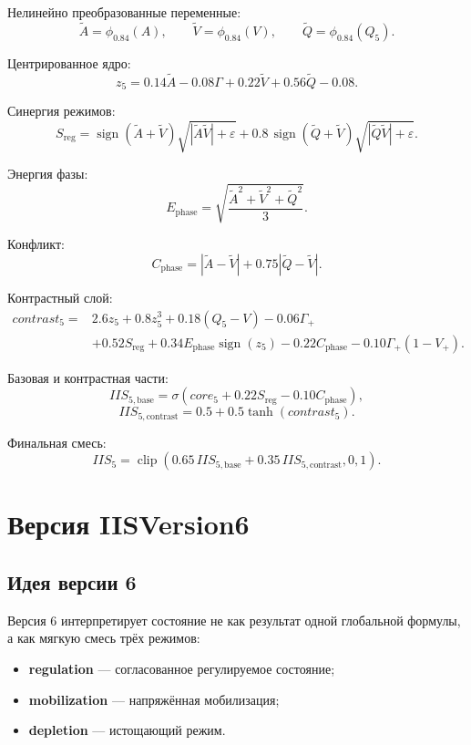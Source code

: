 \documentclass[12pt,a4paper]{article}
\begin{document}
Нелинейно преобразованные переменные:
\[
\widetilde{A}=\phi_{0.84}(A),\qquad
\widetilde{V}=\phi_{0.84}(V),\qquad
\widetilde{Q}=\phi_{0.84}(Q_5).
\]

Центрированное ядро:
\[
z_5=0.14\widetilde{A}-0.08\Gamma+0.22\widetilde{V}+0.56\widetilde{Q}-0.08.
\]

Синергия режимов:
\[
S_{\mathrm{reg}}=
\operatorname{sign}(\widetilde{A}+\widetilde{V})\sqrt{|\widetilde{A}\widetilde{V}|+\varepsilon}
+0.8\,\operatorname{sign}(\widetilde{Q}+\widetilde{V})\sqrt{|\widetilde{Q}\widetilde{V}|+\varepsilon}.
\]

Энергия фазы:
\[
E_{\mathrm{phase}}=\sqrt{\frac{\widetilde{A}^2+\widetilde{V}^2+\widetilde{Q}^2}{3}}.
\]

Конфликт:
\[
C_{\mathrm{phase}}=|\widetilde{A}-\widetilde{V}|+0.75|\widetilde{Q}-\widetilde{V}|.
\]

Контрастный слой:
\[
\begin{aligned}
contrast_5={}&
2.6z_5
+0.8z_5^3
+0.18(Q_5-V)
-0.06\Gamma_+ \\
&+0.52S_{\mathrm{reg}}
+0.34E_{\mathrm{phase}}\operatorname{sign}(z_5)
-0.22C_{\mathrm{phase}}
-0.10\Gamma_+(1-V_+).
\end{aligned}
\]

Базовая и контрастная части:
\[
IIS_{5,\mathrm{base}}=\sigma\!\left(core_5+0.22S_{\mathrm{reg}}-0.10C_{\mathrm{phase}}\right),
\]
\[
IIS_{5,\mathrm{contrast}}=0.5+0.5\tanh(contrast_5).
\]

Финальная смесь:
\[
IIS_5=\operatorname{clip}\!\left(
0.65\,IIS_{5,\mathrm{base}}+0.35\,IIS_{5,\mathrm{contrast}},
0,1\right).
\]

\section{Версия IISVersion6}
\subsection{Идея версии 6}
Версия 6 интерпретирует состояние не как результат одной глобальной формулы, а как мягкую смесь трёх режимов:
\begin{itemize}[leftmargin=1.25cm]
    \item \textbf{regulation} --- согласованное регулируемое состояние;
    \item \textbf{mobilization} --- напряжённая мобилизация;
    \item \textbf{depletion} --- истощающий режим.
\end{itemize}
\end{document}
